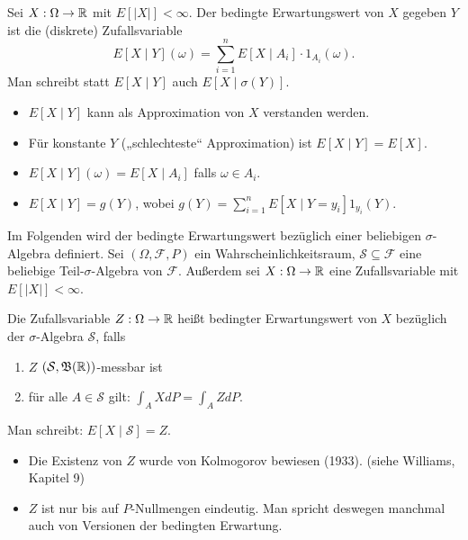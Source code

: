 \documentclass[a4paper,twoside,DIV15,BCOR12mm]{scrbook}
\newcommand{\cF}{\mathcal F}
\newcommand{\borel}{{\mathfrak B}}
\begin{document}
\begin{definition}
Sei $X:\Omega \to \mathbb{R}$ mit $E[|X|]<\infty$. Der bedingte Erwartungswert von $X$ gegeben $Y$ ist die (diskrete) Zufallsvariable 
\[
E[X\mid Y](\omega) = \sum_{i=1}^n E[X\mid A_i] \cdot 1_{A_i}(\omega).
\]
Man schreibt statt $E[X\mid Y]$ auch $E[X\mid \sigma(Y)]$.
\end{definition}

\begin{bemerkung}
\begin{itemize}
\item $E[X\mid Y]$ kann als Approximation von $X$ verstanden werden.
\item Für konstante $Y$ („schlechteste“ Approximation) ist $E[X\mid Y] = E[X]$.
\item $E[X\mid Y](\omega) = E[X\mid A_i]$ falls $\omega\in A_i$.
\item $E[X\mid Y] = g(Y)$, wobei $g(Y) = \sum_{i=1}^n E[X\mid Y=y_i]1_{y_i}(Y)$.
\end{itemize}
\end{bemerkung}

Im Folgenden wird der bedingte Erwartungswert bezüglich einer beliebigen $\sigma$-Algebra definiert. Sei $(\Omega,\cF,P)$ ein Wahrscheinlichkeitsraum, $\mathcal S\subseteq \cF$ eine beliebige Teil-$\sigma$-Algebra von $\cF$. Außerdem sei $X:\Omega\to\mathbb{R}$ eine Zufallsvariable mit $E[|X|]<\infty$.

\begin{definition}
\label{def:2.1.5}Die Zufallsvariable $Z:\Omega\to\mathbb{R}$ heißt bedingter Erwartungswert von $X$ bezüglich der $\sigma$-Algebra $\mathcal S$, falls
\begin{enumerate}
\item $Z$ $(\mathcal S,\borel(\MdR))$-messbar ist
\item für alle $A\in \mathcal S$ gilt: $\int_A XdP = \int_AZ dP$.
\end{enumerate}
Man schreibt: $E[X\mid \mathcal S] = Z$.
\end{definition}


\begin{bemerkung}
\begin{itemize}
\item Die Existenz von $Z$ wurde von Kolmogorov bewiesen (1933). (siehe Williams, Kapitel 9)
\item $Z$ ist nur bis auf $P$-Nullmengen eindeutig. Man spricht deswegen manchmal auch von Versionen der bedingten Erwartung.
\end{itemize}
\end{bemerkung}
\end{document}

